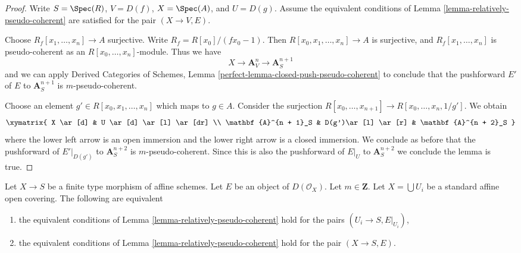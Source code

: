 \begin{proof}
Write $S = \Spec(R)$, $V = D(f)$, $X = \Spec(A)$, and $U = D(g)$.
Assume the equivalent conditions of
Lemma \ref{lemma-relatively-pseudo-coherent}
are satisfied for the pair $(X \to V, E)$.

\medskip\noindent
Choose $R_f[x_1, \ldots, x_n] \to A$ surjective. Write
$R_f = R[x_0]/(fx_0 - 1)$. Then $R[x_0, x_1, \ldots, x_n] \to A$
is surjective, and $R_f[x_1, \ldots, x_n]$ is pseudo-coherent as
an $R[x_0, \ldots, x_n]$-module. Thus we have
$$
X \to \mathbf{A}^n_V \to \mathbf{A}^{n + 1}_S
$$
and we can apply
Derived Categories of Schemes,
Lemma \ref{perfect-lemma-closed-push-pseudo-coherent}
to conclude that the pushforward $E'$ of $E$ to $\mathbf{A}^{n + 1}_S$
is $m$-pseudo-coherent.

\medskip\noindent
Choose an element $g' \in R[x_0, x_1, \ldots, x_n]$ which maps to
$g \in A$. Consider the surjection
$R[x_0, \ldots, x_{n + 1}] \to R[x_0, \ldots, x_n, 1/g']$.
We obtain
$$
\xymatrix{
X \ar[d] & U \ar[d] \ar[l] \ar[dr] \\
\mathbf{A}^{n + 1}_S & D(g')\ar[l] \ar[r] & \mathbf{A}^{n + 2}_S
}
$$
where the lower left arrow is an open immersion and the lower right arrow is
a closed immersion. We conclude as before that the pushforward of
$E'|_{D(g')}$ to $\mathbf{A}^{n + 2}_S$ is $m$-pseudo-coherent.
Since this is also the pushforward of $E|_U$ to $\mathbf{A}^{n + 2}_S$
we conclude the lemma is true.
\end{proof}

\begin{lemma}
\label{lemma-glue-relative-pseudo-coherent}
Let $X \to S$ be a finite type morphism of affine schemes. Let $E$ be an
object of $D(\mathcal{O}_X)$. Let $m \in \mathbf{Z}$.
Let $X = \bigcup U_i$ be a standard affine open covering.
The following are equivalent
\begin{enumerate}
\item the equivalent conditions of
Lemma \ref{lemma-relatively-pseudo-coherent}
hold for the pairs $(U_i \to S, E|_{U_i})$,
\item the equivalent conditions of
Lemma \ref{lemma-relatively-pseudo-coherent}
hold for the pair $(X \to S, E)$.
\end{enumerate}
\end{lemma}

